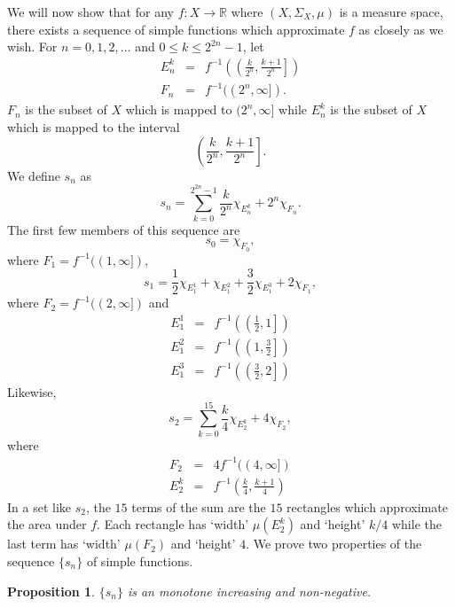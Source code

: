 \documentclass{article}
\newcommand{\sor}{\mathbb{R}}
\theoremstyle{plain}
\numberwithin{thm}{section}
\theoremstyle{plain}
\newtheorem{prop}{Proposition}
\numberwithin{prop}{section}
\theoremstyle{definition}
\numberwithin{defn}{section}
\theoremstyle{remark}
\numberwithin{equation}{section}
\begin{document}
We will now show that for any $f:X \rightarrow \sor$ where $(X, \Sigma_X, \mu)$
is a measure space, there exists a sequence of simple functions which approximate
$f$ as closely as we wish. For $n = 0, 1, 2, \ldots$ and $0 \le k \le 2^{2n} - 1$,
let
\begin{eqnarray*}
E_n^k &=& f^{-1}\left(\left(\frac{k}{2^n}, \frac{k+1}{2^n}\right]\right) \\
F_n &=& f^{-1}((2^n, \infty]).
\end{eqnarray*}
$F_n$ is the subset of $X$ which is mapped to $(2^n, \infty]$ while $E_n^k$ is
the subset of $X$ which is mapped to the interval 
\[
\left(\frac{k}{2^n}, \frac{k+1}{2^n}\right].
\]
We define $s_n$ as 
\begin{equation}\label{s3e1}
s_n = \sum_{k=0}^{2^{2n}-1}\frac{k}{2^n}\chi_{E_n^k} + 2^n\chi_{F_n}.
\end{equation}
The first few members of this sequence are
\begin{equation}\label{s3e2}
s_0 = \chi_{F_0},
\end{equation}
where $F_1 = f^{-1}((1, \infty])$,
\begin{equation}\label{c3e3}
s_1 = \frac{1}{2}\chi_{E_1^1} + \chi_{E_1^2} + \frac{3}{2}\chi_{E_1^3} + 2\chi_{F_1},
\end{equation}
where $F_2 = f^{-1}((2, \infty])$ and
\begin{eqnarray*}
E_1^1 &=& f^{-1}\left(\left(\frac{1}{2}, 1\right]\right) \\
E_1^2 &=& f^{-1}\left(\left(1, \frac{3}{2}\right]\right) \\
E_1^3 &=& f^{-1}\left(\left(\frac{3}{2}, 2\right]\right)
\end{eqnarray*}
Likewise,
\begin{equation}\label{s3e3}
s_2 = \sum_{k=0}^{15}\frac{k}{4}\chi_{E_2^k} + 4\chi_{F_2},
\end{equation}
where
\begin{eqnarray*}
F_2 &=& 4f^{-1}((4, \infty]) \\
E_2^k &=& f^{-1}\left(\frac{k}{4}, \frac{k+1}{4}\right)
\end{eqnarray*}
In a set like $s_2$, the $15$ terms of the sum are the $15$ rectangles which
approximate the area under $f$. Each rectangle has `width' $\mu(E_2^k)$ and
`height' $k/4$ while the last term has `width' $\mu(F_2)$ and `height' $4$.
We prove two properties of the sequence $\{s_n\}$ of simple functions.
\begin{prop}\label{s3p6}
$\{s_n\}$ is an monotone increasing and non-negative.
\end{prop}
\end{document}
